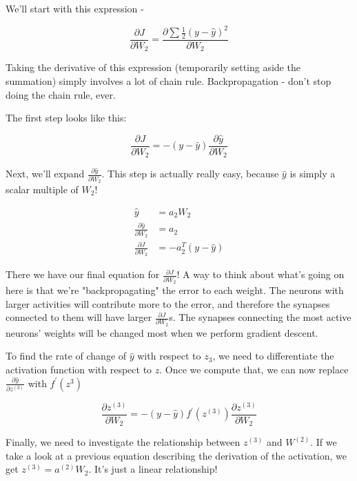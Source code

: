 \documentclass[]{article}
\begin{document}
We'll start with this expression -

\begin{equation}
	\frac{\partial J}{\partial W_2} = \frac{\partial \sum \frac{1}{2}(y-\hat{y})^2}{\partial W_2}
\end{equation}

Taking the derivative of this expression (temporarily setting aside the summation) simply involves a lot of chain rule. Backpropagation - don't stop doing the chain rule, ever.

The first step looks like this:

\begin{equation}
\frac{\partial J}{\partial W_2} = -(y-\hat{y}) \frac{\partial \hat{y}}{\partial W_2}
\end{equation}

Next, we'll expand $\frac{\partial \hat{y}}{\partial W_2}$. This step is actually really easy, because $\hat{y}$ is simply a scalar multiple of $W_2$!

\begin{align}
\hat{y} &= a_2 W_2 \\
\frac{\partial \hat{y}}{\partial W_2} &= a_2 \\
\frac{\partial J}{\partial W_2} &= - a_2^T (y-\hat{y})
\end{align}

There we have our final equation for $\frac{\partial J}{\partial W_2}$! A way to think about what's going on here is that we're "backpropagating" the error to each weight. The neurons with larger activities will contribute more to the error, and therefore the synapses connected to them will have larger $\frac{\partial J}{\partial W_2}$s. The synapses connecting the most active neurons' weights will be changed most when we perform gradient descent.

To find the rate of change of $\hat{y}$ with respect to $z_3$, we need to differentiate the activation function with respect to $z$. Once we compute that, we can now replace $\frac{\partial \hat{y}}{\partial z^{(3)}}$ with $f^\prime(z^{3})$

\begin{equation}
\frac{\partial z^{(3)}}{\partial W_2}=
-(y-\hat{y}) f^\prime(z^{(3)}) \frac{\partial z^{(3)}}{\partial W_2}
\end{equation}

Finally, we need to investigate the relationship between $z^{(3)}$ and $W^({2})$. If we take a look at a previous equation describing the derivation of the activation, we get $z^{(3)} = a^{(2)}W_2$. It's just a linear relationship!
\end{document}
